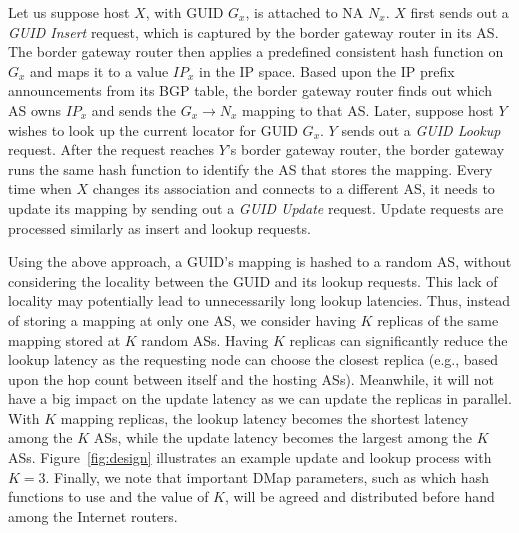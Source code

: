 Let us suppose host $X$, with GUID $G_x$, is attached to NA $N_x$. $X$ first sends out a \emph{GUID Insert} request, which is captured by the border gateway router in its AS. The border gateway router then applies a predefined consistent hash function on $G_x$ and maps it to a value $IP_x$ in the IP space.  Based upon the IP prefix announcements from its BGP table, the border gateway router finds out which AS owns $IP_x$ and sends the $G_x\rightarrow N_x$ mapping to that AS.  Later, suppose host $Y$ wishes to look up the current locator for GUID $G_x$. $Y$ sends out a \emph{GUID Lookup} request. After the request reaches $Y$'s border gateway router, the border gateway runs the same hash function to identify the AS that stores the mapping. Every time when $X$ changes its association and connects to a different AS, it needs to update its mapping by sending out a \emph{GUID Update} request. Update requests are processed similarly as insert and lookup requests.

Using the above approach, a GUID's mapping is hashed to a random AS, without considering the locality between the GUID and its lookup requests. This lack of locality may potentially lead to unnecessarily long lookup latencies.  Thus, instead of storing a mapping at only one AS,  we consider having $K$ replicas of the same mapping stored at $K$ random ASs. Having $K$ replicas can significantly reduce the lookup latency as the requesting node can choose the closest replica (e.g., based upon the hop count between itself and the hosting ASs). Meanwhile, it will not have a big impact on the update latency as we can update the replicas in parallel.
With $K$ mapping replicas, the lookup latency becomes the shortest latency among the $K$ ASs, while the update latency becomes the largest among the $K$ ASs. Figure~\ref{fig:design} illustrates an example update and lookup process with $K = 3$. Finally, we note that important DMap parameters, such as which hash functions to use and the value of $K$, will be agreed and distributed before hand among the Internet routers.

